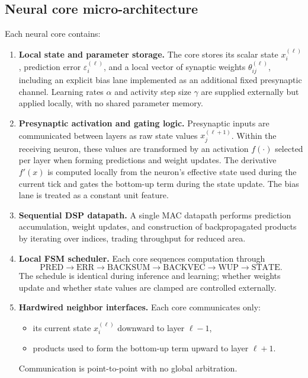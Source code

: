 \documentclass{article}
\begin{document}
\subsection{Neural core micro-architecture}
\label{sec:core}

Each neural core contains:
\begin{enumerate}[leftmargin=*]
  \item \textbf{Local state and parameter storage.}
  The core stores its scalar state \( x_i^{(\ell)} \), prediction error \( \varepsilon_i^{(\ell)} \), and a local vector of synaptic weights \( \theta^{(\ell)}_{ij} \), including an explicit bias lane implemented as an additional fixed presynaptic channel. Learning rates \( \alpha \) and activity step size \( \gamma \) are supplied externally but applied locally, with no shared parameter memory.

\item \textbf{Presynaptic activation and gating logic.}
  Presynaptic inputs are communicated between layers as raw state values \(x_j^{(\ell+1)}\). Within the receiving neuron, these values are transformed by an activation \( f(\cdot) \) selected per layer when forming predictions and weight updates. The derivative \( f'(x) \) is computed locally from the neuron's effective state used during the current tick and gates the bottom-up term during the state update. The bias lane is treated as a constant unit feature.

  \item \textbf{Sequential DSP datapath.}
  A single MAC datapath performs prediction accumulation, weight updates, and construction of backpropagated products by iterating over indices, trading throughput for reduced area.

  \item \textbf{Local FSM scheduler.}
  Each core sequences computation through
  \[
    \text{PRED} \rightarrow \text{ERR} \rightarrow \text{BACKSUM} \rightarrow \text{BACKVEC}
    \rightarrow \text{WUP} \rightarrow \text{STATE}.
  \]
  The schedule is identical during inference and learning; whether weights update and whether state values are clamped are controlled externally.

  \item \textbf{Hardwired neighbor interfaces.}
  Each core communicates only:
  \begin{itemize}[leftmargin=*]
    \item its current state \( x_i^{(\ell)} \) downward to layer \( \ell-1 \),
    \item products used to form the bottom-up term upward to layer \( \ell+1 \).
  \end{itemize}
  Communication is point-to-point with no global arbitration.
\end{enumerate}
\end{document}
